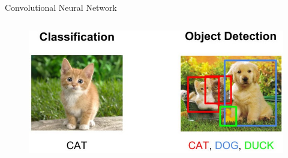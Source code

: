 \begin{frame}{Convolutional Neural Network}
{\begin{columns}[T]
            \begin{figure}
                \centering
                \includegraphics[width=\textwidth]{Bilder/classification_detection.jpeg}
            \end{figure}
        \end{columns}
    }
\end{frame}

